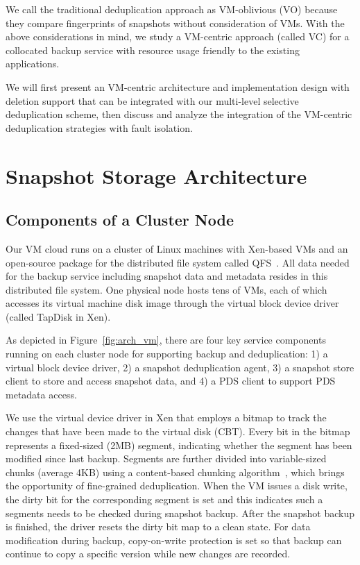 We call the traditional deduplication approach as VM-oblivious (VO)
because they compare fingerprints of snapshots without consideration of VMs.
With the above  considerations in mind, we study a 
VM-centric approach (called VC)
for a collocated backup service with resource usage friendly
to the existing applications.  

We will first present an VM-centric architecture and implementation design with deletion support 
that can be integrated with our multi-level selective deduplication scheme, then
discuss and analyze the integration of the VM-centric deduplication strategies with fault isolation.

\section{Snapshot Storage Architecture}
\label{data:arch}
\subsection{Components of a Cluster Node}
\label{data:node}
Our VM cloud runs on a cluster of Linux machines with Xen-based VMs and
an open-source package for the distributed file system  called QFS~\cite{michael2013}. 
All data needed for the backup service including snapshot data and metadata
resides in this distributed file system. 
One physical node hosts tens of VMs, each of which accesses its virtual machine disk image through the
virtual block device driver (called TapDisk\cite{Warfield2005} in Xen).

As depicted in Figure~\ref{fig:arch_vm}, 
there are four key service components running on each cluster
node  for supporting backup and deduplication: 
1) a virtual block device driver, 2) a snapshot deduplication agent,
3) a snapshot store client to store  and access snapshot data,
and 4)  a PDS client to support PDS metadata access. 

We use the virtual device driver in Xen that employs a bitmap to track the changes 
that have been made to the virtual disk (CBT).
Every bit in the bitmap represents a fixed-sized (2MB) segment, indicating whether the segment
has been modified since last backup. 
Segments are further divided into variable-sized chunks (average 4KB) 
using a content-based chunking algorithm~\cite{frame05}, 
which brings the opportunity of fine-grained deduplication.
When the VM issues a disk write, the dirty bit for the corresponding segment is set
and this indicates such a segments needs to be checked during snapshot backup. 
After the snapshot backup is finished, the driver resets the dirty bit map to a clean state.
For data modification during backup, copy-on-write protection is set so that backup can continue to
copy  a specific version while new changes are recorded.

